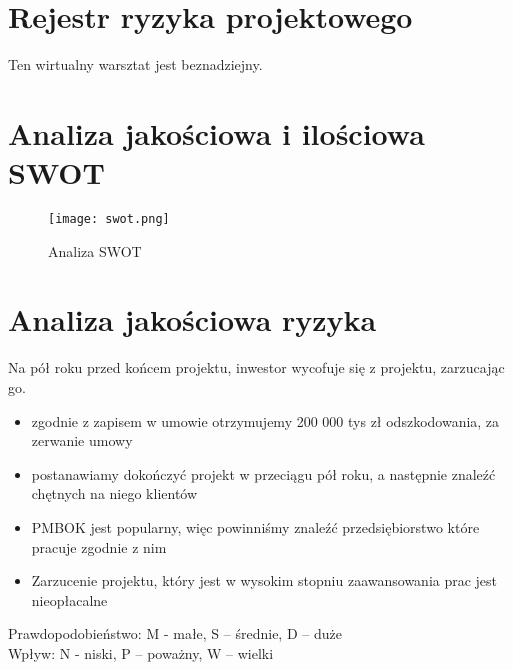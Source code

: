 
\section{Rejestr ryzyka projektowego}

Ten wirtualny warsztat jest beznadziejny.


\section{Analiza jakościowa i ilościowa SWOT}

\begin{figure}[h]
\begin{center}
\texttt{[image: swot.png]}
\caption[Analiza SWOT]{Analiza SWOT}
\label{rysunekProces}
\end{center}
\end{figure}

\clearpage


\section{Analiza jakościowa ryzyka}

Na pół roku przed końcem projektu, inwestor wycofuje się z projektu, zarzucając go.
\begin{itemize}
\item zgodnie z zapisem w umowie otrzymujemy 200 000 tys zł odszkodowania, za zerwanie umowy
\item postanawiamy dokończyć projekt w przeciągu pół roku, a następnie znaleźć chętnych na niego klientów
\item PMBOK jest popularny, więc powinniśmy znaleźć przedsiębiorstwo które pracuje zgodnie z nim
\item Zarzucenie projektu, który jest w wysokim stopniu zaawansowania prac jest nieopłacalne
\end{itemize}


Prawdopodobieństwo:  M - małe, S – średnie, D – duże\\
Wpływ: N - niski, P – poważny, W – wielki

